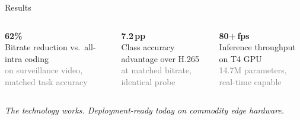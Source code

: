 \documentclass[aspectratio=169, professionalfonts, 10pt]{beamer}
\begin{document}
\begin{frame}{Results}

  \begin{columns}[t]
    \begin{center}
      \vspace{0.5em}
      {\Huge\bfseries 62\%} \\
      \vspace{0.3em}
      \small Bitrate reduction vs.\ all-intra coding \\
      \vspace{0.3em}
      \tiny\textcolor{gray}{on surveillance video, matched task accuracy}
    \end{center}

    \begin{center}
      \vspace{0.5em}
      {\Huge\bfseries 7.2\,pp} \\
      \vspace{0.3em}
      \small Class accuracy advantage over H.265 \\
      \vspace{0.3em}
      \tiny\textcolor{gray}{at matched bitrate, identical probe}
    \end{center}

    \begin{center}
      \vspace{0.5em}
      {\Huge\bfseries 80+\,fps} \\
      \vspace{0.3em}
      \small Inference throughput on T4 GPU \\
      \vspace{0.3em}
      \tiny\textcolor{gray}{14.7M parameters, real-time capable}
    \end{center}
  \end{columns}

  \vspace{1em}
  \begin{center}
    \small
    \textit{The technology works. Deployment-ready today on commodity edge hardware.}
  \end{center}
\end{frame}
\end{document}
